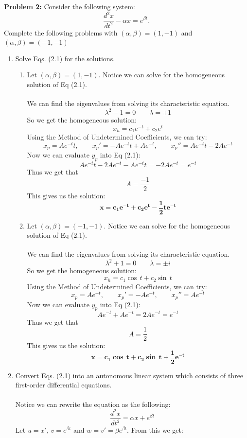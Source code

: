 \documentclass[11pt]{article}
\newenvironment{problem}[1]{\textbf{Problem #1: }}{\newpage}
\begin{document}
	\begin{problem}{2}
		Consider the following system:
		\[\frac{d^2x}{dt^2} - \alpha x = e^{\beta t}. \tag{2.1}\]
		Complete the following problems with $(\alpha,\beta) = (1,-1)$ and $(\alpha,\beta) = (-1,-1)$
		\begin{enumerate}[label = (\alph*)]
			\item  Solve Eqs. (2.1) for the solutions.
			\begin{enumerate}[label = (\roman*)]
				\item Let $(\alpha,\beta) = (1,-1)$.  Notice we can solve for the homogeneous solution of Eq (2.1).
				\\ \\
				We can find the eigenvalues from solving its characteristic equation.
				\[\lambda^2 - 1 = 0 \qquad \lambda = \pm 1\]
				So we get the homogeneous solution:
				\[x_h = c_1e^{-t} + c_2e^{t}\]
				Using the Method of Undetermined Coefficients, we can try:
				\[x_p = Ae^{- t}t, \qquad x_p' = -Ae^{-t}t + Ae^{-t}, \qquad x_p'' = Ae^{-t}t - 2 Ae^{-t} \]
				Now we can evaluate $y_p$ into Eq (2.1):
				\[Ae^{-t}t - 2Ae^{-t} - Ae^{-t}t = -2 Ae^{-t} = e^{-t}\]
				Thus we get that
				\[A = \frac{-1}{2}\]
				This gives us the solution:
				\[\boldsymbol{x = c_1e^{-t} + c_2e^{t} - \frac{1}{2}te^{-t}}\]
				\item Let $(\alpha,\beta) = (-1,-1)$.  Notice we can solve for the homogeneous solution of Eq (2.1).
				\\ \\
				We can find the eigenvalues from solving its characteristic equation.
				\[\lambda^2 + 1 = 0 \qquad \lambda = \pm i\]
				So we get the homogeneous solution:
				\[x_h = c_1\cos\,t + c_2\sin\,t\]
				Using the Method of Undetermined Coefficients, we can try:
				\[x_p = Ae^{- t}, \qquad x_p' = -Ae^{-t}, \qquad x_p'' = Ae^{-t} \]
				Now we can evaluate $y_p$ into Eq (2.1):
				\[Ae^{-t} + Ae^{-t} = 2 Ae^{-t} = e^{-t}\]
				Thus we get that
				\[A = \frac{1}{2}\]
				This gives us the solution:
				\[\boldsymbol{x = c_1\cos\,t + c_2\sin\,t + \frac{1}{2}e^{-t}}\]
			\end{enumerate}
			\newpage
			\item Convert Eqs. (2.1) into an autonomous linear system which
			consists of three first-order differential equations.
			\\ \\
			Notice we can rewrite the equation as the following:
			\[\frac{d^2x}{dt^2} = \alpha x + e^{\beta t}\]
			Let $u = x'$, $v = e^{\beta t}$ and $w = v' = \beta e^{\beta t}$.  From this we get:

\end{enumerate}
\end{problem}
\end{document}
